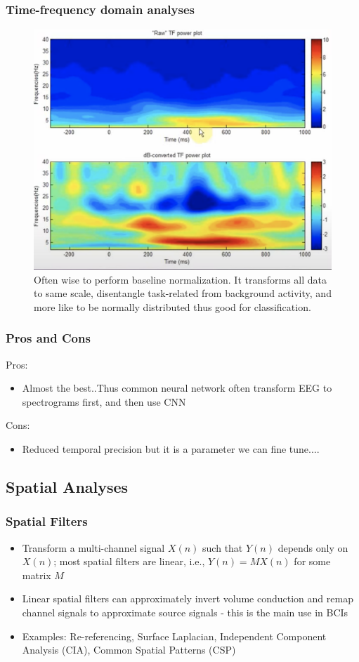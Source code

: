\documentclass{beamer}
\begin{document}
\begin{frame}
\frametitle{Time-frequency domain analyses}
\begin{figure}
		\includegraphics[width=0.6\linewidth]{image/normalization}
		\caption{Often wise to perform baseline normalization.  It transforms all data to same scale, disentangle task-related from background activity, and more like to be normally distributed thus good for classification.}
\end{figure}
\end{frame}

\begin{frame}
\frametitle{Pros and Cons}
Pros:
\begin{itemize}
	\item Almost the best..Thus common neural network often transform EEG to spectrograms first, and then use CNN
\end{itemize}
Cons:
\begin{itemize}
	\item Reduced temporal precision but it is a parameter we can fine tune....
\end{itemize}
\end{frame}

\subsection{Spatial Analyses}

\begin{frame}
\frametitle{Spatial Filters}
\begin{itemize}
	\item Transform a multi-channel signal $X(n)$ such that $Y(n)$ depends only on $X(n)$; most spatial filters are linear, i.e., $Y(n) = MX(n)$ for some matrix $M$
	\item Linear spatial filters can approximately invert volume conduction and remap channel signals to approximate source signals - this is the main use in BCIs
	\item Examples: Re-referencing, Surface Laplacian, Independent Component Analysis (CIA), Common Spatial Patterns (CSP)
\end{itemize}
\end{frame}
%
\end{document}

